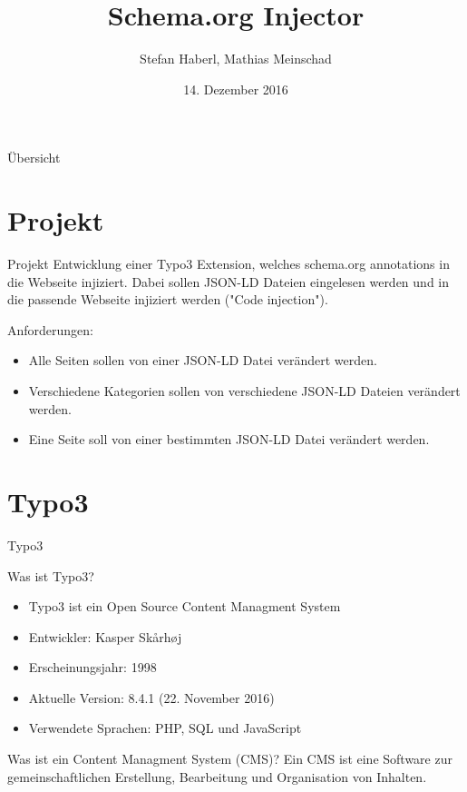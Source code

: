 \documentclass{beamer}
\title{Schema.org Injector}
\author{Stefan Haberl, Mathias Meinschad}
\institute{STI Innsbruck}
\date{14. Dezember 2016}
\begin{document}
\begin{frame}
  \titlepage
\end{frame}

\begin{frame}{Übersicht}
  \tableofcontents
\end{frame}

\section{Projekt}

\begin{frame}{Projekt}
Entwicklung einer Typo3 Extension, welches schema.org annotations in die Webseite injiziert.
Dabei sollen JSON-LD Dateien eingelesen werden und in die passende Webseite injiziert werden ("Code injection").


\begin{block}{Anforderungen:}
\begin{itemize}
\item Alle Seiten sollen von einer JSON-LD Datei verändert werden.
\item Verschiedene Kategorien sollen von verschiedene JSON-LD Dateien verändert werden.
\item Eine Seite soll von einer bestimmten JSON-LD Datei verändert werden.
\end{itemize}
\end{block}
\end{frame}


\section{Typo3}

\begin{frame}{Typo3}
\begin{block}{Was ist Typo3?}
\begin{itemize}
\item Typo3 ist ein Open Source Content Managment System
\item Entwickler: Kasper Skårhøj
\item Erscheinungsjahr: 1998
\item Aktuelle Version: 8.4.1 (22. November 2016)
\item Verwendete Sprachen: PHP, SQL und JavaScript
\end{itemize}
\end{block}
\begin{block}{Was ist ein Content Managment System (CMS)?}
Ein CMS ist eine Software zur gemeinschaftlichen Erstellung, Bearbeitung und Organisation von Inhalten.
\end{block}

\end{frame}
\end{document}
